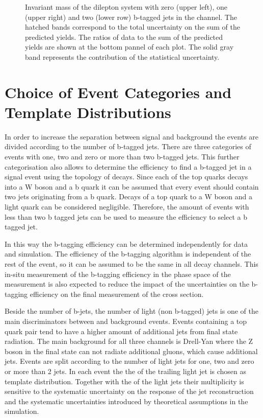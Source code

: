 \begin{figure}[htbp!]
\begin{center}
      \caption{Invariant mass of the dilepton system with zero (upper left), one (upper right) and two (lower row) b-tagged 
      jets in the \emu channel. The hatched
        bands correspond to the total uncertainty on the sum of the
        predicted yields. 
        The ratios of data to the sum of the predicted yields are
        shown at the bottom pannel of each plot. The solid gray band
        represents the contribution of the statistical uncertainty.}  
       \label{fig:xsec_ctrplots_mll}
  \end{center}
\end{figure}



\section{Choice of Event Categories and Template Distributions}
\label{sec:xsec_templates}


In order to increase the separation between signal and background the events are divided according to the number of b-tagged jets.
There are three categories of events with one, two and zero or more than two b-tagged jets.
This further categorisation also allows to determine the efficiency to find a b-tagged jet in a signal event using the topology of \ttbar decays.
Since each of the top quarks decays into a W boson and a b quark it can be assumed that every \ttbar event should contain two jets originating from a b quark.
Decays of a top quark to a W boson and a light quark can be considered negligible.
Therefore, the amount of \ttbar events with less than two b tagged jets can be used to measure the efficiency to select a b tagged jet.

In this way the b-tagging efficiency can be determined independently for data and simulation. The efficiency of the b-tagging algorithm is independent of the rest of the event, so it can be assumed to be the same in all \ttbar decay channels.
This in-situ measurement of the b-tagging efficiency in the phase space of the measurement is also expected to reduce the impact of the uncertainties on the b-tagging efficiency on the final measurement of the \ttbar cross section.

Beside the number of b-jets, the number of light (non b-tagged) jets is one of the main discriminators between \ttbar and background events.
Events containing a top quark pair tend to have a higher amount of additional jets from final state radiation. The main background for all three channels is Drell-Yan where the Z boson in the final state can not radiate additional gluons, 
which cause additional jets.
Events are split according to the number of light jets for one, two and zero or more than 2 jets.
In each event the the \pt of the trailing light jet is chosen as template distribution.
Together with the \pt of the light jets their multiplicity is sensitive to the systematic uncertainty on the response of the jet reconstruction and
the systematic uncertainties introduced by theoretical assumptions in the simulation.

